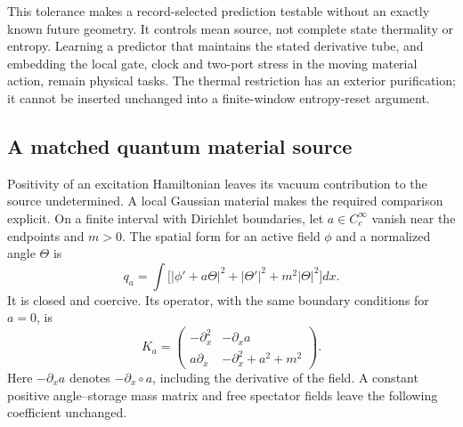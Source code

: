 \documentclass[12pt,a4paper]{article}
\begin{document}
This tolerance makes a record-selected prediction testable without
an exactly known future geometry. It controls mean source, not complete
state thermality or entropy. Learning a predictor that maintains the
stated derivative tube, and embedding the local gate, clock and
two-port stress in the moving material action, remain physical tasks.
The thermal restriction has an exterior purification; it cannot be
inserted unchanged into a finite-window entropy-reset argument.

\subsection{A matched quantum material source}
\label{sec:material-vacuum-source}

Positivity of an excitation Hamiltonian leaves its vacuum contribution
to the source undetermined. A local Gaussian material makes the required
comparison explicit. On a finite interval with Dirichlet boundaries,
let $a\in C_c^\infty$ vanish near the endpoints and $m>0$. The spatial
form for an active field $\phi$ and a normalized angle $\Theta$ is
\[
 q_a=\int\bigl[|\phi'+a\Theta|^2+|\Theta'|^2+m^2|\Theta|^2\bigr]dx.
\]
It is closed and coercive. Its operator, with the same boundary
conditions for $a=0$, is
\[
 K_a=\begin{pmatrix}-\partial_x^2&-\partial_x a\\
 a\partial_x&-\partial_x^2+a^2+m^2\end{pmatrix}.
\]
Here $-\partial_xa$ denotes $-\partial_x\circ a$, including the
derivative of the field. A constant positive angle--storage mass
matrix and free spectator fields leave the following coefficient unchanged.
\end{document}
